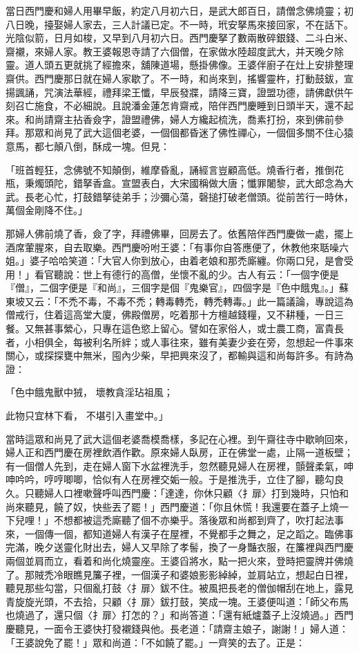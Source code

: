 \begin{showcontents}{}
當日西門慶和婦人用畢早飯，約定八月初六日，是武大郎百日，請僧念佛燒靈；初八日晚，擡娶婦人家去，三人計議已定。不一時，玳安拏馬來接回家，不在話下。光陰似箭，日月如梭，又早到八月初六日。西門慶拏了數兩散碎銀錢、二斗白米、齋襯，來婦人家。教王婆報恩寺請了六個僧，在家做水陸超度武大，并天晚夕除靈。道人頭五更就挑了經擔來，舖陳道場，懸掛佛像。王婆伴廚子在灶上安排整理齋供。西門慶那日就在婦人家歇了。不一時，和尚來到，搖響靈杵，打動鼓鈸，宣揚諷誦，咒演法華經，禮拜梁王懺，早辰發牃，請降三寶，證盟功德，請佛獻供午刻召亡施食，不必細說。且說潘金蓮怎肯齋戒，陪伴西門慶睡到日頭半天，還不起來。和尚請齋主拈香僉字，證盟禮佛，婦人方纔起梳洗，喬素打扮，來到佛前參拜。那眾和尚見了武大這個老婆，一個個都昏迷了佛性禪心，一個個多關不住心猿意馬，都七顛八倒，酥成一塊。但見：

「班首輕狂，念佛號不知顛倒，維摩昏亂，誦經言豈顧高低。燒香行者，推倒花瓶，秉燭頭陀，錯拏香盒。宣盟表白，大宋國稱做大唐；懺罪闍黎，武大郎念為大武。長老心忙，打鼓錯拏徒弟手；沙彌心蕩，磬搥打破老僧頭。從前苦行一時休，萬個金剛降不住。」

那婦人佛前燒了香，僉了字，拜禮佛畢，回房去了。依舊陪伴西門慶做一處，擺上酒席葷腥來，自去取樂。西門慶吩咐王婆：「有事你自答應便了，休教他來聒噪六姐。」婆子哈哈笑道：「大官人你到放心，由着老娘和那禿廝纏。你兩口兒，是會受用！」看官聽說：世上有德行的高僧，坐懷不亂的少。古人有云：「一個字便是『僧』，二個字便是『和尚』，三個字是個『鬼樂官』，四個字是『色中餓鬼』。」蘇東坡又云：「不禿不毒，不毒不禿；轉毒轉禿，轉禿轉毒。」此一篇議論，專說這為僧戒行，住着這高堂大廈，佛殿僧房，吃着那十方檀越錢糧，又不耕種，一日三餐。又無甚事縈心，只專在這色慾上留心。譬如在家俗人，或士農工商，富貴長者，小相俱全，每被利名所絆；或人事往來，雖有美妻少妾在旁，忽想起一件事來關心，或探探甕中無米，囤內少柴，早把興來沒了，都輸與這和尚每許多。有詩為證：

「色中餓鬼獸中狨，  壞教貪淫玷祖風；

此物只宜林下看，  不堪引入畫堂中。」

當時這眾和尚見了武大這個老婆喬模喬樣，多記在心裡。到午齋往寺中歇晌回來，婦人正和西門慶在房裡飲酒作歡。原來婦人臥房，正在佛堂一處，止隔一道板壁；有一個僧人先到，走在婦人窗下水盆裡洗手，忽然聽見婦人在房裡，顫聲柔氣，呻呻吟吟，哼哼唧唧，恰似有人在房裡交姤一般。于是推洗手，立住了腳，聽勾良久。只聽婦人口裡嗽聲呼叫西門慶：「達達，你休只顧〈扌扉〉打到幾時，只怕和尚來聽見，饒了奴，快些丟了罷！」西門慶道：「你且休慌！我還要在蓋子上燒一下兒哩！」不想都被這禿廝聽了個不亦樂乎。落後眾和尚都到齊了，吹打起法事來，一個傳一個，都知道婦人有漢子在屋裡，不覺都手之舞之，足之蹈之。臨佛事完滿，晚夕送靈化財出去，婦人又早除了孝髻，換了一身豔衣服，在簾裡與西門慶兩個並肩而立，看着和尚化燒靈座。王婆舀將水，點一把火來，登時把靈牌并佛燒了。那賊禿冷眼瞧見簾子裡，一個漢子和婆娘影影綽綽，並肩站立，想起白日裡，聽見那些勾當，只個亂打鼓〈扌扉〉鈸不住。被風把長老的僧伽帽刮在地上，露見青旋旋光頭，不去拾，只顧〈扌扉〉鈸打鼓，笑成一塊。王婆便叫道：「師父布馬也燒過了，還只個〈扌扉〉打怎的？」和尚答道：「還有紙爐蓋子上沒燒過。」西門慶聽見，一面令王婆快打發襯錢與他。長老道：「請齋主娘子，謝謝！」婦人道：「王婆說免了罷！」眾和尚道：「不如饒了罷。」一齊笑的去了。正是：


\end{showcontents}

